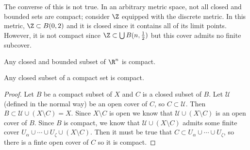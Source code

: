 \begin{example}
The converse of this is not true. In an arbitrary metric space, not all closed and bounded sets are compact; consider $\Z$ equipped with the discrete metric. In this metric, $\Z \subset B(0,2)$ and it is closed since it contains all of its limit points. However, it is not compact since $\Z \subset \bigcup B(n,\frac{1}{2})$ but this cover admits no finite subcover.
\end{example}

\begin{theorem}
Any closed and bounded subset of $\R^n$ is compact.
\end{theorem}

\begin{lemma}
Any closed subset of a compact set is compact.
\end{lemma}

\begin{proof}
Let $B$ be a compact subset of $X$ and $C$ is a closed subset of $B$. Let $\mathcal{U}$ (defined in the normal way) be an open cover of $C$, so $C \subset \mathcal{U}$. Then $B \subset \mathcal{U} \cup (X \setminus C) = X$. Since $X \setminus C$ is open we know that $\mathcal{U} \cup (X \setminus C)$ is an open cover of $B$. Since $B$ is compact, we know that $\mathcal{U} \cup (X \setminus C)$ admits some finite cover $U_\alpha \cup \cdots \cup U_\zeta \cup (X \setminus C)$. Then it must be true that $C \subset U_\alpha \cup \cdots \cup U_\zeta$, so there is a finte open cover of $C$ so it is compact.
\end{proof}






